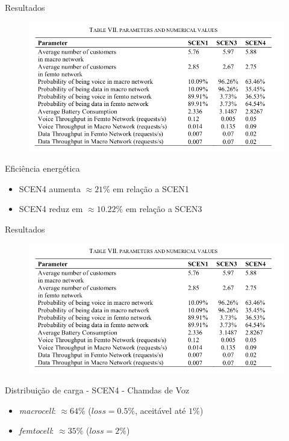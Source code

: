 \begin{frame}{Resultados}
  \begin{figure}[h]
  	\begin{center}
      \includegraphics [scale=0.34]{./Figures/results}
  	\end{center}
  \end{figure}
  \begin{block}{Eficiência energética}
    \begin{itemize}
      \item SCEN4 aumenta $\approx 21\%$ em relação a SCEN1
      \item SCEN4 reduz em $\approx 10.22\%$ em relação a SCEN3
    \end{itemize}
  \end{block}
\end{frame}

\begin{frame}{Resultados}
  \begin{figure}[h]
  	\begin{center}
      \includegraphics [scale=0.34]{./Figures/results}
  	\end{center}
  \end{figure}
  \begin{block}{Distribuição de carga - SCEN4 - Chamdas de Voz}
    \begin{itemize}
      \item \textit{macrocell}: $\approx 64\%$ ($loss = 0.5\%$, aceitável até
      $1\%$)
      \item \textit{femtocell}: $\approx 35\%$ ($loss = 2\%$)
    \end{itemize}
  \end{block}
\end{frame}

